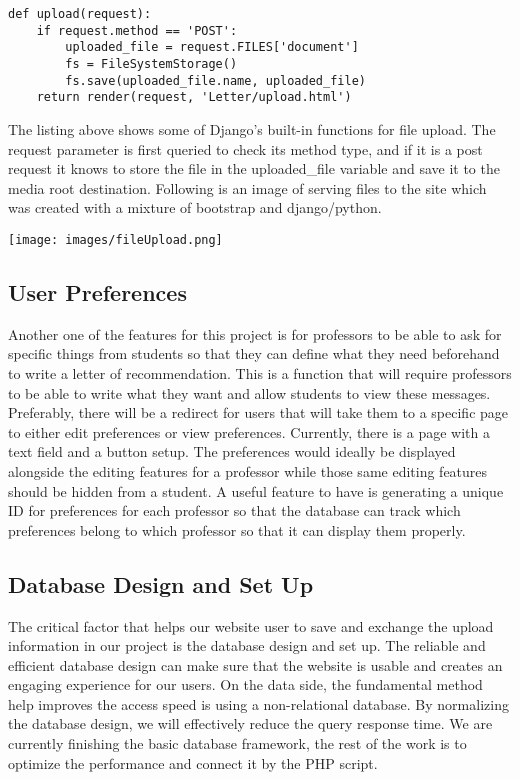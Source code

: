 \documentclass[draftclsnofoot, onecolumn, letterpaper, 10pt]{IEEEtran}
\begin{document}
\begin{lstlisting}[caption={Simple file upload request in Django},captionpos=b]
def upload(request):
    if request.method == 'POST':
        uploaded_file = request.FILES['document']
        fs = FileSystemStorage()
        fs.save(uploaded_file.name, uploaded_file)
    return render(request, 'Letter/upload.html')
\end{lstlisting}

The listing above shows some of Django's built-in functions for file upload. The request parameter is first queried to check its method type, and if it is a post request it knows to store the file in the uploaded\_file variable and save it to the media root destination. Following is an image of serving files to the site which was created with a mixture of bootstrap and django/python. 

\texttt{[image: images/fileUpload.png]}


\subsection{User Preferences}
Another one of the features for this project is for professors to be able to ask for specific things from students so that they can define what they need beforehand to write a letter of recommendation. This is a function that will require professors to be able to write what they want and allow students to view these messages. Preferably, there will be a redirect for users that will take them to a specific page to either edit preferences or view preferences. Currently, there is a page with a text field and a button setup. The preferences would ideally be displayed alongside the editing features for a professor while those same editing features should be hidden from a student. A useful feature to have is generating a unique ID for preferences for each professor so that the database can track which preferences belong to which professor so that it can display them properly.

\subsection{Database Design and Set Up}
The critical factor that helps our website user to save and exchange the upload information in our project is the database design and set up. The reliable and efficient database design can make sure that the website is usable and creates an engaging experience for our users. On the data side, the fundamental method help improves the access speed is using a non-relational database. By normalizing the database design,  we will effectively reduce the query response time.  We are currently finishing the basic database framework, the rest of the work is to optimize the performance and connect it by the PHP script. 
\end{document}
